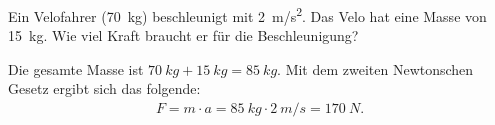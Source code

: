 
\begin{aufgabe}
	Ein Velofahrer (\SI{70}{kg}) beschleunigt mit \SI{2}{m/s^2}.
	Das Velo hat eine Masse von \SI{15}{kg}.
	Wie viel Kraft braucht er für die Beschleunigung?
	\begin{loesung}
		Die gesamte Masse ist $\SI{70}{kg} + \SI{15}{kg}=\SI{85}{kg}$.
		Mit dem zweiten Newtonschen Gesetz ergibt sich das folgende:
		\begin{eqnarray*}
			F=m\cdot a=\SI{85}{kg}\cdot\SI{2}{m/s}=\SI{170}{N}\text{.}
		\end{eqnarray*}
	\end{loesung}
\end{aufgabe}


